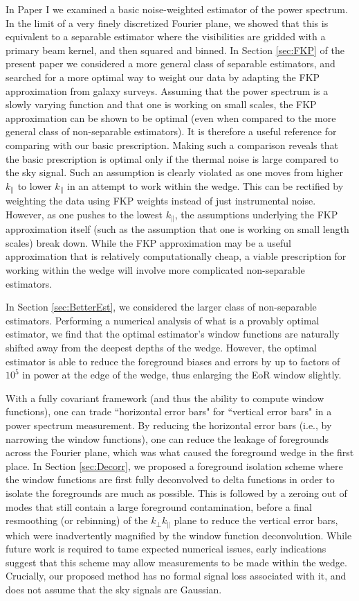 \documentclass[twocolumn,aps,prd,nofootinbib,showpacs]{revtex4-1}
\begin{document}
In Paper I we examined a basic noise-weighted estimator of the power spectrum.  In the limit of a very finely discretized Fourier plane, we showed that this is equivalent to a separable estimator where the visibilities are gridded with a primary beam kernel, and then squared and binned.  In Section \ref{sec:FKP} of the present paper we considered a more general class of separable estimators, and searched for a more optimal way to weight our data by adapting the FKP approximation from galaxy surveys.  Assuming that the power spectrum is a slowly varying function and that one is working on small scales, the FKP approximation can be shown to be optimal (even when compared to the more general class of non-separable estimators).  It is therefore a useful reference for comparing with our basic prescription.  Making such a comparison reveals that the basic prescription is optimal only if the thermal noise is large compared to the sky signal.  Such an assumption is clearly violated as one moves from higher $k_\parallel$ to lower $k_\parallel$ in an attempt to work within the wedge.  This can be rectified by weighting the data using FKP weights instead of just instrumental noise.  However, as one pushes to the lowest $k_\parallel$, the assumptions underlying the FKP approximation itself (such as the assumption that one is working on small length scales) break down.  While the FKP approximation may be a useful approximation that is relatively computationally cheap, a viable prescription for working within the wedge will involve more complicated non-separable estimators.

In Section \ref{sec:BetterEst}, we considered the larger class of non-separable estimators.  Performing a numerical analysis of what is a provably optimal estimator, we find that the optimal estimator's window functions are naturally shifted away from the deepest depths of the wedge.  However, the optimal estimator is able to reduce the foreground biases and errors by up to factors of $10^5$ in power at the edge of the wedge, thus enlarging the EoR window slightly.

With a fully covariant framework (and thus the ability to compute window functions), one can trade ``horizontal error bars" for ``vertical error bars" in a power spectrum measurement.  By reducing the horizontal error bars (i.e., by narrowing the window functions), one can reduce the leakage of foregrounds across the Fourier plane, which was what caused the foreground wedge in the first place.  In Section \ref{sec:Decorr}, we proposed a foreground isolation scheme where the window functions are first fully deconvolved to delta functions in order to isolate the foregrounds are much as possible.  This is followed by a zeroing out of modes that still contain a large foreground contamination, before a final resmoothing (or rebinning) of the $k_\perp k_\parallel$ plane to reduce the vertical error bars, which were inadvertently magnified by the window function deconvolution.  While future work is required to tame expected numerical issues, early indications suggest that this scheme may allow measurements to be made within the wedge.  Crucially, our proposed method has no formal signal loss associated with it, and does not assume that the sky signals are Gaussian.
\end{document}
